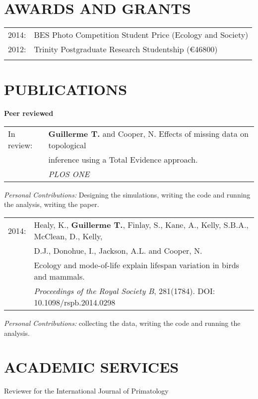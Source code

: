 \documentclass[10pt,a4paper]{article}
\begin{document}
{\section{AWARDS AND GRANTS}
\begin{tabular}{ll}
2014: & BES Photo Competition Student Price (Ecology and Society)\\
2012: & Trinity Postgraduate Research Studentship (\euro46800)\\
& \\ 
\end{tabular}
\bigskip

\section{PUBLICATIONS}
\raggedright\textbf{Peer reviewed}\\[1.5ex]
\begin{tabular}{ll}
In review: & \textbf{Guillerme T.} and Cooper, N. Effects of missing data on topological\\
& inference using a Total Evidence approach.\\
& \textit{PLOS ONE}\\ [1.5ex]
\end{tabular}
\textit{Personal Contributions:} Designing the simulations, writing the code and running the analysis, writing the paper.
\bigskip

\begin{tabular}{ll}
2014: & Healy, K., \textbf{Guillerme T.}, Finlay, S., Kane, A., Kelly, S.B.A., McClean, D., Kelly, \\
& D.J., Donohue, I., Jackson, A.L. and Cooper, N. \\
& Ecology and mode-of-life explain lifespan variation in birds and mammals.\\
& \textit{Proceedings of the Royal Society B}, 281(1784). DOI: 10.1098/rspb.2014.0298\\ [1.5ex]
\end{tabular}
\bigskip
\textit{Personal Contributions:} collecting the data, writing the code and running the analysis.
\bigskip


\section{ACADEMIC SERVICES}
Reviewer for the International Journal of Primatology
\bigskip

}
\end{document}
